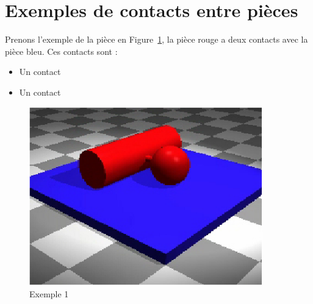 \documentclass[10pt,fleqn,draft]{article} %
\begin{document}
\section{Exemples de contacts entre pièces}
\begin{exemple}
  Prenons l'exemple de la pièce en Figure~\ref{fig:exemple1}, la pièce rouge a deux contacts avec la pièce bleu. Ces contacts sont :

  \begin{itemize}
    \item Un contact 
    \item Un contact 
  \end{itemize}
\end{exemple}
\begin{figure}[h]
  \centering
  \includegraphics[width=0.9\textwidth,height=.2\textheight,keepaspectratio]{images/lineique_ponctuel}
  \caption{Exemple 1}
  \label{fig:exemple1}
\end{figure}
\end{document}
